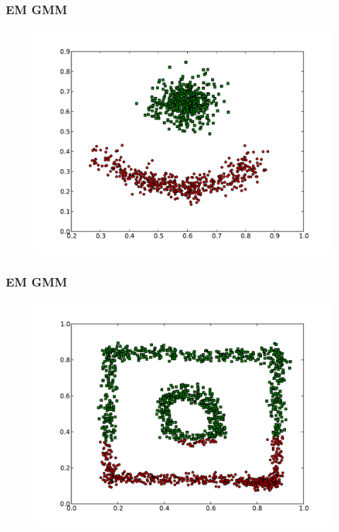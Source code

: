 \documentclass{beamer}
\begin{document}
\begin{frame}
\frametitle{EM GMM}
    \begin{figure}[]
    \includegraphics[scale=0.3]{GMM_red-blue-clusters.pdf}
    \end{figure}
\end{frame}

\begin{frame}
\frametitle{EM GMM}
    \begin{figure}[]
    \includegraphics[scale=0.3]{GMM_circle-weird.pdf}
    \end{figure}
\end{frame}
\end{document}
